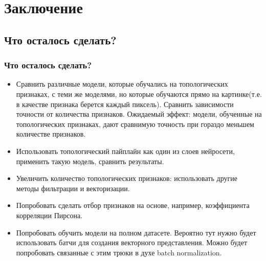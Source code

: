 \documentclass{beamer}
\begin{document}
	\section{Заключение}
		\subsection{Что осталось сделать?}
		\begin{frame}
			\frametitle{Что осталось сделать?}
			\begin{itemize}
				\item Сравнить различные модели, которые обучались на топологических признаках, с теми же моделями, но которые обучаются прямо на картинке(т.е. в качестве признака берется каждый пиксель). Сравнить зависимости точности от количества признаков. Ожидаемый эффект: модели, обученные на топологических признаках, дают сравнимую точность при гораздо меньшем количестве признаков.
				\item Использовать топологический пайплайн как один из слоев нейросети, применить такую модель, сравнить результаты.
				\item Увеличить количество топологических признаков: использовать другие методы фильтрации и векторизации.
				\item Попробовать сделать отбор признаков на основе, например, коэффициента корреляции Пирсона. 
				\item Попробовать обучить модели на полном датасете. Вероятно тут нужно будет использовать батчи для создания векторного представления. Можно будет попробовать связанные с этим трюки в духе batch normalization.  
			\end{itemize}
		\end{frame}
\end{document}
